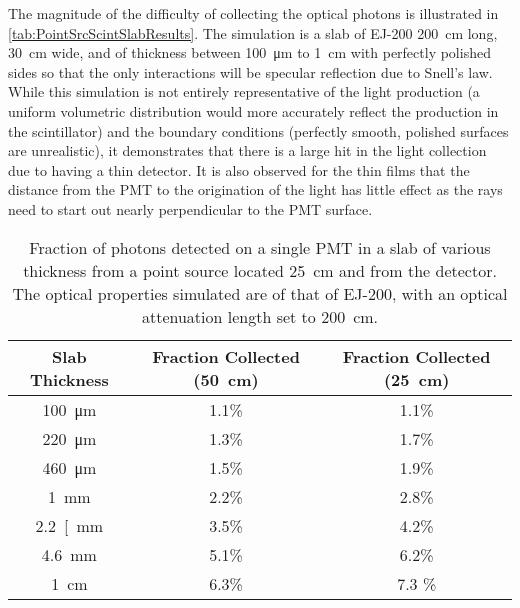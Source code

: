 The magnitude of the difficulty of collecting the optical photons is illustrated in \autoref{tab:PointSrcScintSlabResults}.
The simulation is a slab of EJ-200 \SI{200}{\cm} long, \SI{30}{\cm} wide, and of thickness between \SI{100}{\um} to \SI{1}{\cm} with perfectly polished sides so that the only interactions will be specular reflection due to Snell's law.
While this simulation is not entirely representative of the light production (a uniform volumetric distribution would more accurately reflect the production in the scintillator) and the boundary conditions (perfectly smooth, polished surfaces are unrealistic), it demonstrates that there is a large hit in the light collection due to having a thin detector.
It is also observed for the thin films that the distance from the PMT to the origination of the light has little effect as the rays need to start out nearly perpendicular to the PMT surface.
\begin{table}
	\caption[Fraction of Photons Detected from a Point Source on a single PMT]{Fraction of photons detected on a single PMT in a slab of various thickness from a point source located \SI{25}{\cm} and  from the detector.  The optical properties simulated are of that of EJ-200, with an optical attenuation length set to \SI{200}{\cm}.}
	\label{tab:PointSrcScintSlabResults}
	\begin{tabular}{c | c  c}
	\toprule
	Slab Thickness & Fraction Collected (\SI{50}{\cm}) & Fraction Collected (\SI{25}{\cm}) \\
	\midrule
	\SI{100}{\um} & 1.1\% & 1.1\% \\
	\SI{220}{\um} & 1.3\% & 1.7\% \\
	\SI{460}{\um} & 1.5\% & 1.9\% \\
	\SI{1}{\mm} & 2.2\% & 2.8\% \\
	\SI{2.2}[\mm} & 3.5\% & 4.2\% \\
	\SI{4.6}{\mm} & 5.1\% & 6.2\% \\
	\SI{1}{\cm} & 6.3\% & 7.3 \% \\
	\bottomrule
	\end{tabular}
\end{table}